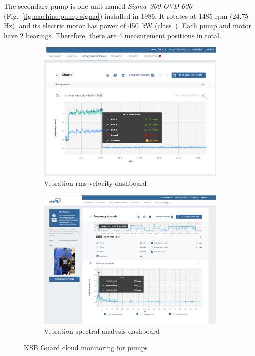 The secondary pump is one unit named \emph{Sigma~300-OVD-600} (Fig.~\ref{fig:machine:pump-sigma}) installed in 1986. It rotates at 1485 rpm (24.75 Hz), and its electric motor has power of 450~kW (class~). Each pump and motor have 2 bearings. Therefore, there are 4 measurement positions in total.

\begin{figure}[h]
    \centering
    \begin{subfigure}[b]{0.49\textwidth}
    		\centering
        \includegraphics[width=\textwidth]{assets/design/ksb-guard-rms.png}
        \caption{Vibration rms velocity dashboard}
    \end{subfigure}
    \hfill
    \begin{subfigure}[b]{0.49\textwidth}
    		\centering
        \includegraphics[width=\textwidth]{assets/design/ksb-guard-spectrum.png}
        \caption{Vibration spectral analysis dashboard}
    \end{subfigure}
     \caption{KSB Guard cloud monitoring for pumps}
     \label{fig:design:ksb-guard}
\end{figure}

